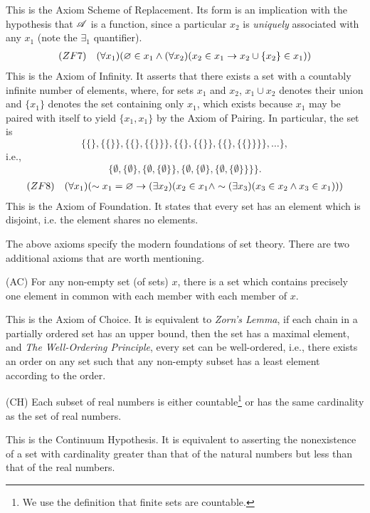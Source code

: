 This is the Axiom Scheme of Replacement. Its form is an implication with the hypothesis that \(\mathscr{A}\) is a function, since a particular \(x_2\) is \textit{uniquely} associated with any \(x_1\) (note the \(\exists_1\) quantifier).
\begin{align*}
  (ZF7)&&
  (\forall x_1)(\varnothing \in x_1 \land (\forall x_2)(x_2 \in x_1 \rightarrow x_2 \cup \{x_2\} \in x_1))
\end{align*}
This is the Axiom of Infinity. It asserts that there exists a set with a countably infinite number of elements, where, for sets \(x_1\) and \(x_2\), \(x_1 \cup x_2\) denotes their union and \(\{x_1\}\) denotes the set containing only \(x_1\), which exists because \(x_1\) may be paired with itself to yield \(\{x_1, x_1\}\) by the Axiom of Pairing. In particular, the set is
\[\{\{\}, \{\{\}\}, \{\{\}, \{\{\}\}\}, \{\{\}, \{\{\}\}, \{\{\}, \{\{\}\}\}\}, \dots\},\]
i.e.,
\[\{\emptyset, \{\emptyset\}, \{\emptyset, \{\emptyset\}\}, \{\emptyset, \{\emptyset\}, \{\emptyset, \{\emptyset\}\}\}\}.\]
\begin{align*}
  (ZF8)&&
  (\forall x_1)(\sim x_1 = \varnothing \rightarrow (\exists x_2)(x_2 \in x_1 \land \sim(\exists x_3)(x_3 \in x_2 \land x_3 \in x_1)))
\end{align*}
This is the Axiom of Foundation. It states that every set has an element which is disjoint, i.e. the element shares no elements.

The above axioms specify the modern foundations of set theory. There are two additional axioms that are worth mentioning.

\medskip
(AC) For any non-empty set (of sets) \(x\), there is a set which contains precisely one element in common with each member with each member of \(x\).
\medskip

This is the Axiom of Choice. It is equivalent to \textit{Zorn's Lemma}, if each chain in a partially ordered set has an upper bound, then the set has a maximal element, and \textit{The Well-Ordering Principle}, every set can be well-ordered, i.e., there exists an order on any set such that any non-empty subset has a least element according to the order.

\medskip
(CH) Each subset of real numbers is either countable\footnote{We use the definition that finite sets are countable.} or has the same cardinality as the set of real numbers.
\medskip

This is the Continuum Hypothesis. It is equivalent to asserting the nonexistence of a set with cardinality greater than that of the natural numbers but less than that of the real numbers.


